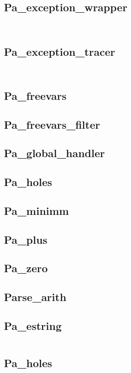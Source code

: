 \subsection{Pa\_exception\_wrapper}
\inputminted[fontsize=\scriptsize, fontsize=\scriptsize, ]{ocaml}{camlp4/example/pa_exception_wrapper.ml}
\inputminted[fontsize=\scriptsize, fontsize=\scriptsize, ]{ocaml}{camlp4/example/test_pa_exception_wrapper.ml}

\subsection{Pa\_exception\_tracer}
\inputminted[fontsize=\scriptsize, fontsize=\scriptsize, ]{ocaml}{camlp4/example/pa_exception_tracer.ml}
\inputminted[fontsize=\scriptsize, fontsize=\scriptsize, ]{ocaml}{camlp4/example/test_pa_exception_tracer.ml}


\subsection{Pa\_freevars}


\subsection{Pa\_freevars\_filter}


\subsection{Pa\_global\_handler}

\subsection{Pa\_holes}

\subsection{Pa\_minimm}


\subsection{Pa\_plus}

\subsection{Pa\_zero}

\subsection{Parse\_arith}


\subsection{Pa\_estring}
\inputminted[fontsize=\scriptsize, fontsize=\scriptsize, ]{ocaml}{camlp4/example/pa_estring.ml}


\subsection{Pa\_holes}
